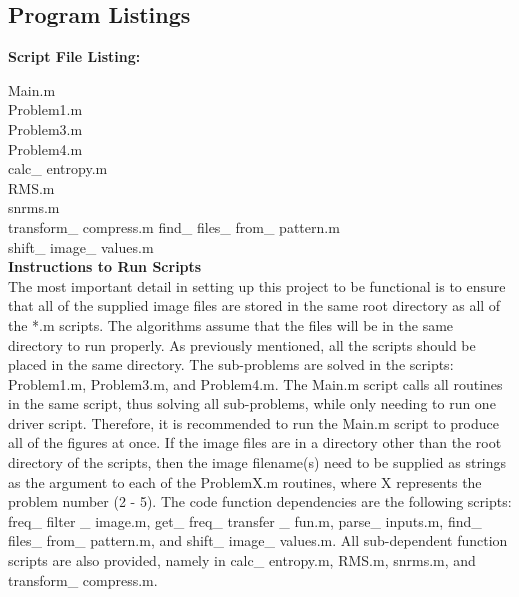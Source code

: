 \documentclass[./rarnold_project_89.tex]{subfiles}
\begin{document}
\clearpage

\subsection*{Program Listings}

\noindent \textbf{Script File Listing:}

\noindent Main.m \\
Problem1.m \\
Problem3.m \\
Problem4.m \\
calc\_ entropy.m \\
RMS.m \\
snrms.m \\
transform\_ compress.m
find\_ files\_ from\_ pattern.m \\
shift\_ image\_ values.m \\


\noindent \textbf{Instructions to Run Scripts} \\

\noindent The most important detail in setting up this project to be functional is to ensure that all of the supplied image files are stored in the same root directory as all of the *.m scripts.  The algorithms assume that the files will be in the same directory to run properly.  As previously mentioned, all the scripts should be placed in the same directory.  The sub-problems are solved in the scripts: Problem1.m, Problem3.m, and Problem4.m.  The Main.m script calls all routines in the same script, thus solving all sub-problems, while only needing to run one driver script.  Therefore, it is recommended to run the Main.m script to produce all of the figures at once.  If the image files are in a directory other than the root directory of the scripts, then the image filename(s) need to be supplied as strings as the argument to each of the ProblemX.m routines, where X represents the problem number (2 - 5).  The code function dependencies are the following scripts: freq\_ filter \_ image.m, get\_ freq\_ transfer \_ fun.m, parse\_ inputs.m, find\_ files\_ from\_ pattern.m, and shift\_ image\_ values.m.  All sub-dependent function scripts are also provided, namely in calc\_ entropy.m, RMS.m, snrms.m, and transform\_ compress.m.
\end{document}
